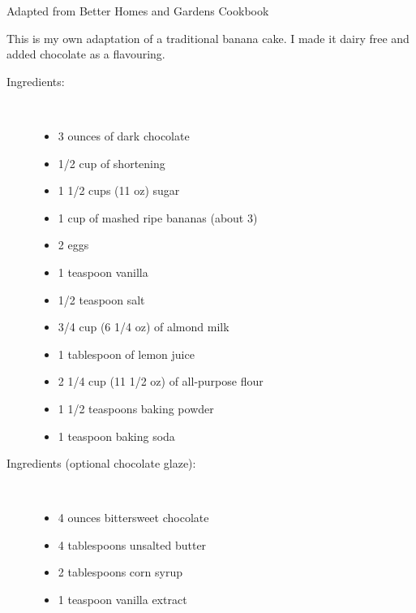 \documentclass[11pt,letterpaper]{article}
\begin{document}


{\hspace{2in} Adapted from Better Homes and Gardens Cookbook}

\vspace{0.5in}

This is my own adaptation of a traditional banana cake. I made it dairy free and added chocolate as a flavouring.
\begin{description}

\item[Ingredients:]\ \\
	\begin{itemize}
	\item 3 ounces of dark chocolate
	\item 1/2 cup of shortening
	\item 1 1/2 cups (11 oz) sugar
	\item 1 cup of mashed ripe bananas (about 3)
	\item 2 eggs
	\item 1 teaspoon vanilla
	\item 1/2 teaspoon salt
	\item 3/4 cup (6 1/4 oz) of almond milk 
	\item 1 tablespoon of lemon juice
        \item 2 1/4 cup (11 1/2 oz) of all-purpose flour
	\item 1 1/2 teaspoons baking powder
	\item 1 teaspoon baking soda
	\end{itemize}
	
\item[Ingredients (optional chocolate glaze):]\ \\
	\begin{itemize}
	\item 4 ounces bittersweet chocolate
	\item 4 tablespoons unsalted butter
	\item 2 tablespoons corn syrup
	\item 1 teaspoon vanilla extract
	\end{itemize}
	

\end{description}
\end{document}
